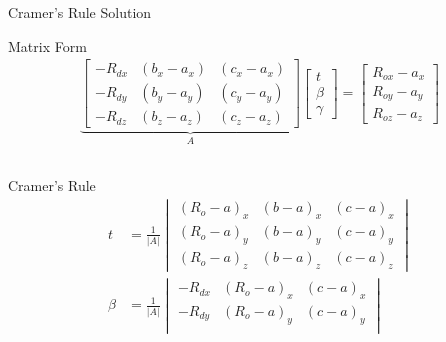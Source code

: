 \begin{frame}{Cramer's Rule Solution}
    \begin{mathbox}{Matrix Form}
        \vspace{-0.5cm}
        \small
        \begin{align*}
            \underbrace{
                \begin{bmatrix}
                    -R_{dx} & (b_x-a_x) & (c_x-a_x) \\
                    -R_{dy} & (b_y-a_y) & (c_y-a_y) \\
                    -R_{dz} & (b_z-a_z) & (c_z-a_z)
                \end{bmatrix}
            }_{A}
            \begin{bmatrix}
                t \\ \beta \\ \gamma
            \end{bmatrix}
            =
            \begin{bmatrix}
                R_{ox} - a_x \\
                R_{oy} - a_y \\
                R_{oz} - a_z
            \end{bmatrix}
        \end{align*}
    \end{mathbox}
    \vspace{-0.1cm}
    \begin{columns}
        \begin{column}{0.6\textwidth}
            \begin{mathbox}{Cramer's Rule}
                \vspace{-0.3cm}
                \footnotesize
                \begin{align*}
                    t &= \frac{1}{|A|} \begin{vmatrix}
                        (R_o-a)_x & (b-a)_x & (c-a)_x \\
                        (R_o-a)_y & (b-a)_y & (c-a)_y \\
                        (R_o-a)_z & (b-a)_z & (c-a)_z
                    \end{vmatrix} \\
                    \beta &= \frac{1}{|A|} \begin{vmatrix}
                        -R_{dx} & (R_o-a)_x & (c-a)_x \\
                        -R_{dy} & (R_o-a)_y & (c-a)_y \\

\end{vmatrix}
\end{align*}
\end{mathbox}
\end{column}
\end{columns}
\end{frame}
